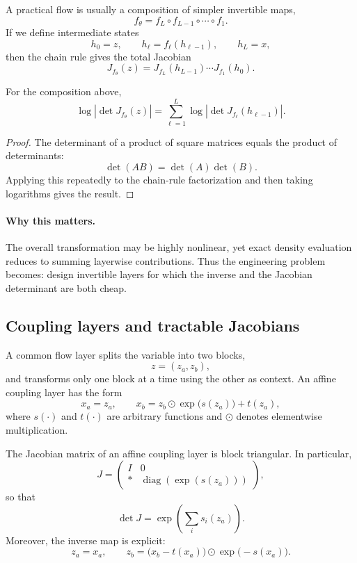 A practical flow is usually a composition of simpler invertible maps,
\[
f_\theta = f_L\circ f_{L-1}\circ \cdots \circ f_1.
\]
If we define intermediate states
\[
h_0=z, \qquad h_\ell=f_\ell(h_{\ell-1}), \qquad h_L=x,
\]
then the chain rule gives the total Jacobian
\[
J_{f_\theta}(z)=J_{f_L}(h_{L-1})\cdots J_{f_1}(h_0).
\]

\begin{proposition}
For the composition above,
\[
\log \left|\det J_{f_\theta}(z)\right|
=
\sum_{\ell=1}^L \log\left|\det J_{f_\ell}(h_{\ell-1})\right|.
\]
\end{proposition}

\begin{proof}
The determinant of a product of square matrices equals the product of determinants:
\[
\det(AB)=\det(A)\det(B).
\]
Applying this repeatedly to the chain-rule factorization and then taking logarithms gives the result.
\end{proof}

\paragraph{Why this matters.}
The overall transformation may be highly nonlinear, yet exact density evaluation reduces to summing layerwise contributions.
Thus the engineering problem becomes: design invertible layers for which the inverse and the Jacobian determinant are both cheap.

\subsection*{Coupling layers and tractable Jacobians}

A common flow layer splits the variable into two blocks,
\[
z=(z_a,z_b),
\]
and transforms only one block at a time using the other as context.
An affine coupling layer has the form
\[
x_a = z_a,
\qquad
x_b = z_b \odot \exp\bigl(s(z_a)\bigr) + t(z_a),
\]
where $s(\cdot)$ and $t(\cdot)$ are arbitrary functions and $\odot$ denotes elementwise multiplication.

\begin{proposition}
The Jacobian matrix of an affine coupling layer is block triangular. In particular,
\[
J =
\begin{pmatrix}
I & 0\\
\ast & \operatorname{diag}(\exp(s(z_a)))
\end{pmatrix},
\]
so that
\[
\det J = \exp\!\left(\sum_i s_i(z_a)\right).
\]
Moreover, the inverse map is explicit:
\[
z_a=x_a,
\qquad
z_b=\bigl(x_b-t(x_a)\bigr)\odot \exp\bigl(-s(x_a)\bigr).
\]
\end{proposition}

